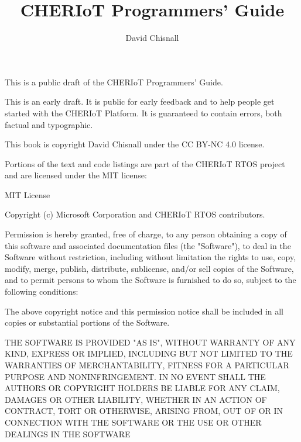 \title{CHERIoT Programmers' Guide}
\author{David Chisnall}

\if[output=sile]{\eject{}\par{}}

\if[output=html]{\img[alt="Cover image showing a large number of cats in boxes inisde a chip as a metaphor for compartmentalisation",src="figures/Cover.jpg",class="cover-image"]{}}

This is a public draft of the CHERIoT Programmers' Guide.

\begin{warning}
This is an early draft.
It is public for early feedback and to help people get started with the CHERIoT Platform.
It is guaranteed to contain errors, both factual and typographic.
\end{warning}

This book is copyright David Chisnall under the CC BY-NC 4.0 license.

Portions of the text and code listings are part of the CHERIoT RTOS project and are licensed under the MIT license:

MIT License

Copyright (c) Microsoft Corporation and CHERIoT RTOS contributors.

Permission is hereby granted, free of charge, to any person obtaining a copy
of this software and associated documentation files (the "Software"), to deal
in the Software without restriction, including without limitation the rights
to use, copy, modify, merge, publish, distribute, sublicense, and/or sell
copies of the Software, and to permit persons to whom the Software is
furnished to do so, subject to the following conditions:

The above copyright notice and this permission notice shall be included in all
copies or substantial portions of the Software.

THE SOFTWARE IS PROVIDED "AS IS", WITHOUT WARRANTY OF ANY KIND, EXPRESS OR
IMPLIED, INCLUDING BUT NOT LIMITED TO THE WARRANTIES OF MERCHANTABILITY,
FITNESS FOR A PARTICULAR PURPOSE AND NONINFRINGEMENT. IN NO EVENT SHALL THE
AUTHORS OR COPYRIGHT HOLDERS BE LIABLE FOR ANY CLAIM, DAMAGES OR OTHER
LIABILITY, WHETHER IN AN ACTION OF CONTRACT, TORT OR OTHERWISE, ARISING FROM,
OUT OF OR IN CONNECTION WITH THE SOFTWARE OR THE USE OR OTHER DEALINGS IN THE
SOFTWARE



















